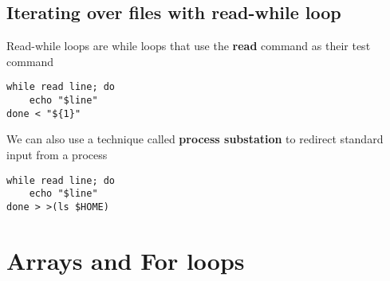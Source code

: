 \documentclass{report}
\begin{document}
    \pagebreak \bigbreak \noindent 
    \subsection{Iterating over files with read-while loop}
    \bigbreak \noindent 
    \begin{concept}
        Read-while loops are while loops that use the \textbf{read} command as their test command
    \end{concept}
    \begin{mdframed}[style=purplebox]
    \begin{verbatim}
while read line; do
    echo "$line"
done < "${1}"
    \end{verbatim}
    \bigbreak \noindent
    \end{mdframed}
    \bigbreak \noindent 
    We can also use a technique called \textbf{process substation} to redirect standard input from a process
    \begin{mdframed}[style=purplebox]
    \begin{verbatim}
while read line; do
    echo "$line"
done > >(ls $HOME)
    \end{verbatim}
    \bigbreak \noindent
    \end{mdframed}

    \pagebreak \bigbreak \noindent 
    \section{\LARGE Arrays and For loops}
    \bigbreak \noindent 

    





  




  




    

    





    
\end{document}
